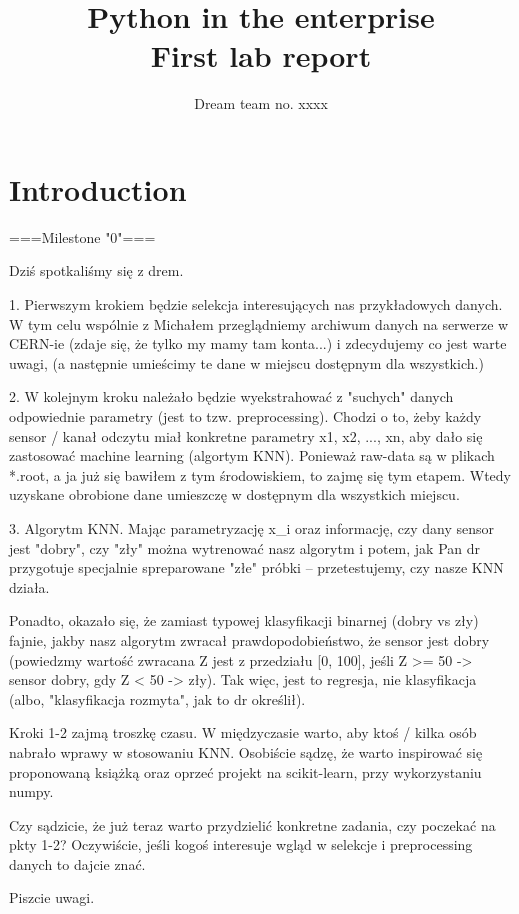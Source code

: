 \documentclass[a4paper,10pt]{article}
\title{\textbf{Python in the enterprise} \\ First lab report}
\author{Dream team no. xxxx}
\begin{document}
\maketitle

\section{Introduction}
===Milestone "0"===

Dziś spotkaliśmy się z drem.


1. Pierwszym krokiem będzie selekcja interesujących nas przykładowych danych. W tym celu wspólnie z Michałem przeglądniemy archiwum danych na serwerze w CERN-ie (zdaje się, że tylko my mamy tam konta...) i zdecydujemy co jest warte uwagi, (a następnie umieścimy te dane w miejscu dostępnym dla wszystkich.)

2. W kolejnym kroku należało będzie wyekstrahować z "suchych" danych odpowiednie parametry (jest to tzw. preprocessing). 
Chodzi o to, żeby każdy sensor / kanał odczytu miał konkretne parametry {x1, x2, ..., xn}, aby dało się zastosować machine learning (algortym KNN). Ponieważ raw-data są w plikach *.root, a ja już się bawiłem z tym środowiskiem, to zajmę się tym etapem. Wtedy uzyskane obrobione dane umieszczę w dostępnym dla wszystkich miejscu.

3. Algorytm KNN. Mając parametryzację {x_i} oraz informację, czy dany sensor jest "dobry", czy "zły" można wytrenować nasz algorytm i potem, jak Pan dr przygotuje specjalnie spreparowane "złe" próbki -- przetestujemy, czy nasze KNN działa.

Ponadto, okazało się, że zamiast typowej klasyfikacji binarnej (dobry vs zły) fajnie, jakby nasz algorytm zwracał prawdopodobieństwo, że sensor jest dobry (powiedzmy wartość zwracana Z jest z przedziału [0, 100], jeśli  Z >= 50 -> sensor dobry, gdy Z < 50 -> zły).
Tak więc, jest to regresja, nie klasyfikacja (albo, "klasyfikacja rozmyta", jak to dr określił).


Kroki 1-2 zajmą troszkę czasu. W międzyczasie warto, aby ktoś / kilka osób nabrało wprawy w stosowaniu KNN.
Osobiście sądzę, że warto inspirować się proponowaną książką oraz oprzeć projekt na scikit-learn, przy wykorzystaniu numpy.

Czy sądzicie, że już teraz warto przydzielić konkretne zadania, czy poczekać na pkty 1-2?
Oczywiście, jeśli kogoś interesuje wgląd w selekcje i preprocessing danych to dajcie znać.

Piszcie uwagi.
\end{document}
